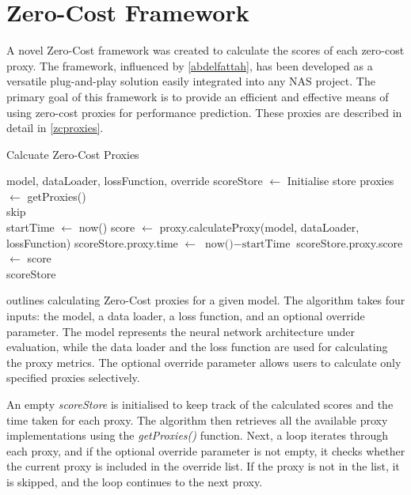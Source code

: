 \section{Zero-Cost Framework}\label{sec:zc-framework}

A novel Zero-Cost framework was created to calculate the scores of each zero-cost proxy. The framework, influenced by \cref{abdelfattah}, has been developed as a versatile plug-and-play solution easily integrated into any \gls{NAS} project. The primary goal of this framework is to provide an efficient and effective means of using zero-cost proxies for performance prediction. These proxies are described in detail in \cref{zcproxies}.

\begin{algorithm}
    \begin{algorithmic}[1]
        \caption{Calcuate Zero-Cost Proxies}\label{alg:zc_framework}
        \Require model, dataLoader, lossFunction, override
        \State scoreStore $\gets$ Initialise store
        \State proxies $\gets$ getProxies() 
        \\
                    \State skip
                \EndIf
            \EndIf
            \\
            \State startTime $\gets$ now()
            \State score $\gets$ proxy.calculateProxy(model, dataLoader, lossFunction)
            \State scoreStore.proxy.time $\gets$ $\text{now()}-\text{startTime}$
            \State scoreStore.proxy.score $\gets$ score
        \EndFor
        \\
        \State \Return scoreStore
        
    \end{algorithmic}
\end{algorithm}

 outlines calculating Zero-Cost proxies for a given model. The algorithm takes four inputs: the model, a data loader, a loss function, and an optional override parameter. The model represents the neural network architecture under evaluation, while the data loader and the loss function are used for calculating the proxy metrics. The optional override parameter allows users to calculate only specified proxies selectively.

An empty \textit{scoreStore} is initialised to keep track of the calculated scores and the time taken for each proxy. The algorithm then retrieves all the available proxy implementations using the \textit{getProxies()} function. Next, a loop iterates through each proxy, and if the optional override parameter is not empty, it checks whether the current proxy is included in the override list. If the proxy is not in the list, it is skipped, and the loop continues to the next proxy.

